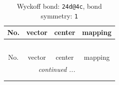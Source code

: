\documentclass[fleqn,8pt]{jsarticle}
\begin{document}
\renewcommand{\arraystretch}{1.2}
\begin{longtable}{cccc}
\caption{Wyckoff bond: {\tt 24d@4c}, bond symmetry: {\tt 1}}
 \\
 \hline \hline
No. & vector & center & mapping \\ \hline \endfirsthead

\multicolumn{3}{l}{\tablename\ \thetable{}} \\
 \hline \hline
No. & vector & center & mapping \\ \hline \endhead

 \hline \hline
\multicolumn{3}{r}{\footnotesize\it continued ...} \\ \endfoot

 \hline \hline
\multicolumn{3}{r}{} \\ \endlastfoot


\end{longtable}
\end{document}
